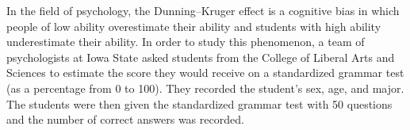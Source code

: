 \documentclass[addpoints]{examsetup}\usepackage[]{graphicx}\usepackage[]{color}
\begin{document}
\begin{questions}


\question

In the field of psychology, the Dunning–Kruger effect is a cognitive bias in which people of low ability overestimate their ability and students with high ability underestimate their ability.
In order to study this phenomenon, a team of psychologists at Iowa State asked students from the College of Liberal Arts and Sciences to estimate the score they would receive on a standardized grammar test (as a percentage from 0 to 100).
They recorded the student's sex, age, and major. 
The students were then given the standardized grammar test with 50 questions and the number of correct answers was recorded.

\end{questions}
\end{document}
